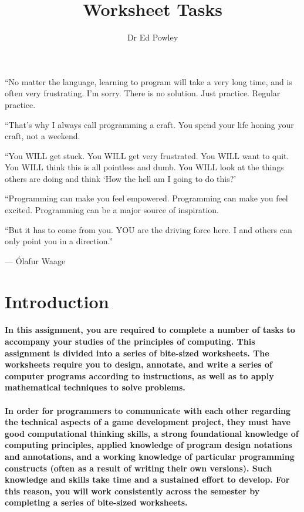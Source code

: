 \documentclass{../../fal_assignment}
\title{Worksheet Tasks}
\author{Dr Ed Powley}
\begin{document}
\maketitle

\begin{marginquote}
``No matter the language, learning to program will take a very long time, and is often very frustrating. I'm sorry. There is no solution. Just practice. Regular practice.

``That's why I always call programming a craft. You spend your life honing your craft, not a weekend.

``You WILL get stuck.
You WILL get very frustrated.
You WILL want to quit.
You WILL think this is all pointless and dumb.
You WILL look at the things others are doing and think `How the hell am I going to do this?'

``Programming can make you feel empowered.
Programming can make you feel excited.
Programming can be a major source of inspiration.

``But it has to come from you. YOU are the driving force here. I and others can only point you in a direction.''

\par --- \'Olafur Waage
\end{marginquote}

\section*{Introduction}

\paragraph{In this assignment, you are required to complete a number of tasks to accompany your studies of the principles of computing. This assignment is divided into a series of bite-sized \textbf{worksheets}. The worksheets require you to \textbf{design}, \textbf{annotate}, and \textbf{write} a series of computer programs according to instructions, as well as to \textbf{apply} mathematical techniques to \textbf{solve} problems.}

\paragraph{In order for programmers to communicate with each other regarding the technical aspects of a game development project, they must have good computational thinking skills, a strong foundational knowledge of computing principles, applied knowledge of program design notations and annotations, and a working knowledge of particular programming constructs (often as a result of writing their own versions). Such knowledge and skills take time and a sustained effort to develop. For this reason, you will work consistently across the semester by completing a series of bite-sized worksheets.}
\end{document}
